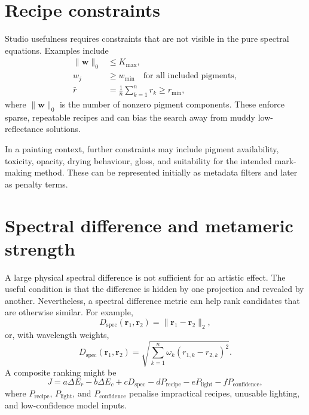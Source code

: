 \documentclass[11pt,a4paper]{article}
\newcommand{\vect}[1]{\boldsymbol{#1}}
\newcommand{\DE}{\Delta E}
\begin{document}
\section{Recipe constraints}

Studio usefulness requires constraints that are not visible in the pure spectral equations. Examples include
\begin{align}
 \|\vect{w}\|_0 &\le K_{\max}, \label{eq:sparsity_constraint}\\
 w_j &\ge w_{\min}\quad \text{for all included pigments}, \label{eq:min_weight}\\
 \bar{r} &= \frac{1}{n}\sum_{k=1}^{n}r_k \ge r_{\min}, \label{eq:high_key_constraint}
\end{align}
where $\|\vect{w}\|_0$ is the number of nonzero pigment components. These enforce sparse, repeatable recipes and can bias the search away from muddy low-reflectance solutions.

In a painting context, further constraints may include pigment availability, toxicity, opacity, drying behaviour, gloss, and suitability for the intended mark-making method. These can be represented initially as metadata filters and later as penalty terms.

\section{Spectral difference and metameric strength}

A large physical spectral difference is not sufficient for an artistic effect. The useful condition is that the difference is hidden by one projection and revealed by another. Nevertheless, a spectral difference metric can help rank candidates that are otherwise similar. For example,
\begin{equation}
 D_{\mathrm{spec}}(\vect{r}_1,\vect{r}_2)=\|\vect{r}_1-\vect{r}_2\|_2,
\end{equation}
or, with wavelength weights,
\begin{equation}
 D_{\mathrm{spec}}(\vect{r}_1,\vect{r}_2)=
 \sqrt{\sum_{k=1}^{n}\omega_k(r_{1,k}-r_{2,k})^2}.
\end{equation}
A composite ranking might be
\begin{equation}
 J=a\DE_r-b\DE_c+cD_{\mathrm{spec}}-dP_{\mathrm{recipe}}-eP_{\mathrm{light}}-fP_{\mathrm{confidence}},
 \label{eq:composite_score}
\end{equation}
where $P_{\mathrm{recipe}}$, $P_{\mathrm{light}}$, and $P_{\mathrm{confidence}}$ penalise impractical recipes, unusable lighting, and low-confidence model inputs.
\end{document}

